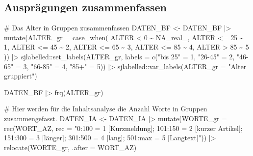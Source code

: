 \documentclass[twoside, pagesize, fontsize=11pt, dvipsnames]{scrreport}
\newenvironment{Shaded}{\begin{snugshade}}{\end{snugshade}}
\newcommand{\AttributeTok}[1]{\textcolor[rgb]{0.40,0.45,0.13}{#1}}
\newcommand{\CommentTok}[1]{\textcolor[rgb]{0.37,0.37,0.37}{#1}}
\newcommand{\ConstantTok}[1]{\textcolor[rgb]{0.56,0.35,0.01}{#1}}
\newcommand{\DecValTok}[1]{\textcolor[rgb]{0.68,0.00,0.00}{#1}}
\newcommand{\FunctionTok}[1]{\textcolor[rgb]{0.28,0.35,0.67}{#1}}
\newcommand{\NormalTok}[1]{\textcolor[rgb]{0.00,0.23,0.31}{#1}}
\newcommand{\OtherTok}[1]{\textcolor[rgb]{0.00,0.23,0.31}{#1}}
\newcommand{\SpecialCharTok}[1]{\textcolor[rgb]{0.37,0.37,0.37}{#1}}
\newcommand{\StringTok}[1]{\textcolor[rgb]{0.13,0.47,0.30}{#1}}
\begin{document}
\hypertarget{auspruxe4gungen-zusammenfassen}{%
\subsection{Ausprägungen
zusammenfassen}\label{auspruxe4gungen-zusammenfassen}}

\begin{Shaded}
\begin{Highlighting}[]
\CommentTok{\# Das Alter in Gruppen zusammenfassen}
\NormalTok{DATEN\_BF }\OtherTok{\textless{}{-}}\NormalTok{ DATEN\_BF }\SpecialCharTok{|\textgreater{}} 
  \FunctionTok{mutate}\NormalTok{(}\AttributeTok{ALTER\_gr =} \FunctionTok{case\_when}\NormalTok{(}
\NormalTok{    ALTER }\SpecialCharTok{\textless{}} \DecValTok{0} \SpecialCharTok{\textasciitilde{}} \ConstantTok{NA\_real\_}\NormalTok{,}
\NormalTok{    ALTER }\SpecialCharTok{\textless{}=} \DecValTok{25} \SpecialCharTok{\textasciitilde{}} \DecValTok{1}\NormalTok{,}
\NormalTok{    ALTER }\SpecialCharTok{\textless{}=} \DecValTok{45} \SpecialCharTok{\textasciitilde{}} \DecValTok{2}\NormalTok{,}
\NormalTok{    ALTER }\SpecialCharTok{\textless{}=} \DecValTok{65} \SpecialCharTok{\textasciitilde{}} \DecValTok{3}\NormalTok{,}
\NormalTok{    ALTER }\SpecialCharTok{\textless{}=} \DecValTok{85} \SpecialCharTok{\textasciitilde{}} \DecValTok{4}\NormalTok{,}
\NormalTok{    ALTER }\SpecialCharTok{\textgreater{}} \DecValTok{85} \SpecialCharTok{\textasciitilde{}} \DecValTok{5}
\NormalTok{  ))  }\SpecialCharTok{|\textgreater{}} 
\NormalTok{  sjlabelled}\SpecialCharTok{::}\FunctionTok{set\_labels}\NormalTok{(ALTER\_gr, }\AttributeTok{labels =} \FunctionTok{c}\NormalTok{(}\StringTok{"bis 25"}  \OtherTok{=} \DecValTok{1}\NormalTok{, }\StringTok{"26{-}45"} \OtherTok{=} \DecValTok{2}\NormalTok{, }\StringTok{"46{-}65"} \OtherTok{=} \DecValTok{3}\NormalTok{, }\StringTok{"66{-}85"} \OtherTok{=} \DecValTok{4}\NormalTok{, }\StringTok{"85+"} \OtherTok{=} \DecValTok{5}\NormalTok{)) }\SpecialCharTok{|\textgreater{}} 
\NormalTok{  sjlabelled}\SpecialCharTok{::}\FunctionTok{var\_labels}\NormalTok{(}\AttributeTok{ALTER\_gr =} \StringTok{"Alter gruppiert"}\NormalTok{)}

\NormalTok{DATEN\_BF }\SpecialCharTok{|\textgreater{}} \FunctionTok{frq}\NormalTok{(ALTER\_gr)}

\CommentTok{\# Hier werden für die Inhaltsanalyse die Anzahl Worte in Gruppen zusammengefasst.}
\NormalTok{DATEN\_IA }\OtherTok{\textless{}{-}}\NormalTok{ DATEN\_IA }\SpecialCharTok{|\textgreater{}} 
  \FunctionTok{mutate}\NormalTok{(}\AttributeTok{WORTE\_gr =} \FunctionTok{rec}\NormalTok{(WORT\_AZ, }
                        \AttributeTok{rec =} \StringTok{"0:100 = 1 [Kurzmeldung];}
\StringTok{                        101:150 = 2 [kurzer Artikel]; }
\StringTok{                        151:300 = 3 [länger]; }
\StringTok{                        301:500 = 4 [lang]; }
\StringTok{                        501:max = 5 [Langtext]"}\NormalTok{)) }\SpecialCharTok{|\textgreater{}} 
    \FunctionTok{relocate}\NormalTok{(WORTE\_gr, }\AttributeTok{.after =}\NormalTok{ WORT\_AZ) }



\end{Highlighting}
\end{Shaded}
\end{document}

